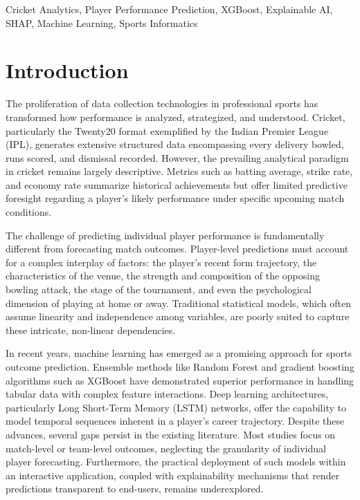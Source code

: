 \documentclass[conference]{IEEEtran}
\begin{document}
\begin{IEEEkeywords}
Cricket Analytics, Player Performance Prediction, XGBoost, Explainable AI, SHAP, Machine Learning, Sports Informatics
\end{IEEEkeywords}

\section{Introduction}
The proliferation of data collection technologies in professional sports has transformed how performance is analyzed, strategized, and understood. Cricket, particularly the Twenty20 format exemplified by the Indian Premier League (IPL), generates extensive structured data encompassing every delivery bowled, runs scored, and dismissal recorded. However, the prevailing analytical paradigm in cricket remains largely descriptive. Metrics such as batting average, strike rate, and economy rate summarize historical achievements but offer limited predictive foresight regarding a player's likely performance under specific upcoming match conditions.

The challenge of predicting individual player performance is fundamentally different from forecasting match outcomes. Player-level predictions must account for a complex interplay of factors: the player's recent form trajectory, the characteristics of the venue, the strength and composition of the opposing bowling attack, the stage of the tournament, and even the psychological dimension of playing at home or away. Traditional statistical models, which often assume linearity and independence among variables, are poorly suited to capture these intricate, non-linear dependencies.

In recent years, machine learning has emerged as a promising approach for sports outcome prediction. Ensemble methods like Random Forest and gradient boosting algorithms such as XGBoost have demonstrated superior performance in handling tabular data with complex feature interactions. Deep learning architectures, particularly Long Short-Term Memory (LSTM) networks, offer the capability to model temporal sequences inherent in a player's career trajectory. Despite these advances, several gaps persist in the existing literature. Most studies focus on match-level or team-level outcomes, neglecting the granularity of individual player forecasting. Furthermore, the practical deployment of such models within an interactive application, coupled with explainability mechanisms that render predictions transparent to end-users, remains underexplored.
\end{document}
